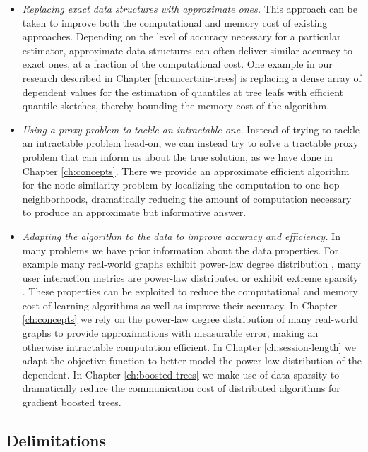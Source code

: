 \begin{itemize}
	\item \emph{Replacing exact data structures with approximate ones.} This approach can be taken
	to improve both the computational and memory cost of existing approaches. Depending on the
	level of accuracy necessary for a particular estimator, approximate data structures
	can often deliver similar accuracy to exact ones, at a fraction of the computational cost.
	One example in our research described in Chapter \ref{ch:uncertain-trees} is replacing a dense array of dependent values for the
	estimation of quantiles at tree leafs with efficient quantile sketches, thereby bounding the
	memory cost of the algorithm.
	\item \emph{Using a proxy problem to tackle an intractable one.} Instead of trying to
	tackle an intractable problem head-on, we can instead try to solve a
	tractable proxy problem that can inform us about the true solution, as we have done
	in Chapter \ref{ch:concepts}. There we provide an approximate efficient algorithm for the node similarity problem by localizing the computation to one-hop neighborhoods, dramatically reducing the
	amount of computation necessary to produce an approximate but informative answer.
	\item \emph{Adapting the algorithm to the data to improve accuracy and efficiency.} In many problems
	we have prior information about the data properties. For example many real-world graphs exhibit
	power-law degree distribution \cite{small-world, barabasi-small-world}, many user interaction metrics are power-law
	distributed \cite{phonecalls, faloutsos1999internet, click-stream-power-law} or exhibit extreme sparsity \cite{esl}. These properties can
	be exploited to reduce the computational and memory cost of learning algorithms as well as
	improve their accuracy. In Chapter \ref{ch:concepts} we rely on the power-law degree
	distribution of many real-world graphs to provide approximations with measurable error,
	making an otherwise intractable computation efficient. In Chapter \ref{ch:session-length}
	we adapt the objective function to better model the power-law distribution of the dependent.
	In Chapter \ref{ch:boosted-trees} we make use of data sparsity to dramatically reduce
	the communication cost of distributed algorithms for gradient boosted trees.
\end{itemize}

\subsection*{Delimitations}


